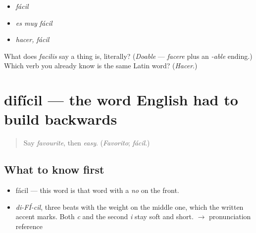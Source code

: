 \begin{itemize}
\raggedright
  \item \emph{fácil}
  \item \emph{es muy fácil}
  \item \emph{hacer, fácil}
\end{itemize}

\begin{tcolorbox}[breakable,colback=teal!4,colframe=teal!35!black,title={Before you move on}]
What does \emph{facilis} say a thing is, literally? (\emph{Doable} — \emph{facere} plus an \emph{-able} ending.) Which verb you already know is the same Latin word? (\emph{Hacer}.)
\end{tcolorbox}
\section[difícil]{difícil — the word English had to build backwards}

\label{lesson:ES-C398-dificil}



\begin{quote}
Say \emph{favourite}, then \emph{easy}. (\emph{Favorito}; \emph{fácil}.)
\end{quote}

\subsection*{What to know first}
\begin{itemize}
\raggedright
  \item fácil — this word is that word with a \emph{no} on the front.
\end{itemize}

\begin{sounds}
\begin{itemize}
\raggedright
  \item \emph{di-FÍ-cil}, three beats with the weight on the middle one, which the written accent marks. Both \emph{c} and the second \emph{i} stay soft and short. $\to$ pronunciation reference
\end{itemize}
\end{sounds}

